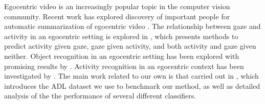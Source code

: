 \documentclass{bmvc2k}
\begin{document}
%








  Egocentric video is an increasingly popular topic in the computer vision
  community. Recent work has explored discovery of important people for
  automatic summarization of egocentric
  video \cite{Lee12}. The relationship between gaze and activity in an
  egocentric setting is explored in \cite{Fathi12}, which presents methods
  to predict activity given gaze, gaze given activity, and both activity and
  gaze given neither. Object recognition in an egocentric setting has been
  explored with promising results by \cite{Ramanan12, Fathi11, Ren09}.
  Activity recognition in an egocentric context has been investigated by
  \cite{Ramanan12, Fathi11_}.
  The main work related to our own is that carried out in \cite{Ramanan12}, 
  which introduces the ADL dataset we use to benchmark our method, 
  as well as detailed analysis of the the
	performance of several different classifiers. 
	
\end{document}
